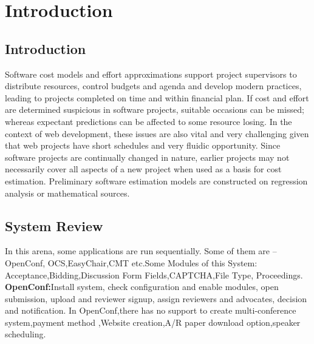 \chapter{Introduction}

\section{Introduction}
Software cost models and effort approximations support project supervisors to distribute resources, control budgets and agenda and develop modern practices, leading to projects completed on time and within financial plan. If cost and effort are determined suspicious in software projects, suitable occasions can be missed; whereas expectant predictions can be affected to some resource losing. In the context of web development, these issues are also vital and very challenging given that web projects have short schedules and very fluidic opportunity. Since software projects are continually changed in nature, earlier projects may not necessarily cover all aspects of a new project when used as a basis for cost estimation. Preliminary software estimation models are constructed on regression analysis or mathematical sources.
\section{System Review}

In this arena, some applications are run sequentially. Some of them are – OpenConf, OCS,EasyChair,CMT etc.Some
Modules of this System: Acceptance,Bidding,Discussion
Form Fields,CAPTCHA,File Type, Proceedings.\newline
\textbf{OpenConf:}Install system, check configuration and enable modules, open submission,
 upload and reviewer signup, assign reviewers and advocates, decision and notification.\cite{ref2}\newline
In OpenConf,there has no support to create multi-conference system,payment method
,Website creation,A/R paper download option,speaker scheduling.\newline


